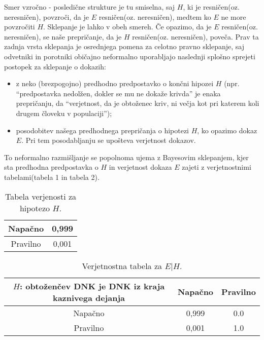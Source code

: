 \documentclass[a4paper,12pt]{article}
\begin{document}
Smer vzročno - posledične strukture je tu smiselna, saj $H$, ki je resničen(oz. neresničen), povzroči, da je $E$ resničen(oz. neresničen), 
medtem ko $E$ ne more povzročiti $H$. Sklepanje je lahko v obeh smereh. Če opazimo, da je $E$ resničen(oz. neresničen), se naše prepričanje, 
da je $H$ resničen(oz. neresničen), poveča. Prav ta zadnja vrsta sklepanja je osrednjega pomena za celotno pravno sklepanje, saj odvetniki in 
porotniki običajno neformalno uporabljajo naslednji splošno sprejeti postopek za sklepanje o dokazih:
\begin{itemize}
    \item z neko (brezpogojno) predhodno predpostavko o končni hipozei $H$ (npr. "`predpostavka nedolžen, dokler se mu ne dokaže krivda"' je enaka 
    prepričanju, da "`verjetnost, da je obtoženec kriv, ni večja kot pri katerem koli drugem človeku v populaciji"');
    \item posodobitev našega predhodnega prepričanja o hipotezi $H$, ko opazimo dokaz $E$. Pri tem posodabljanju se upošteva verjetnost dokazov.
\end{itemize}

To neformalno razmišljanje se popolnoma ujema z Bayesovim sklepanjem, kjer sta predhodna predpostavka o $H$ in verjetnost dokaza $E$ zajeti z 
verjetnostnimi tabelami(tabela 1 in tabela 2).

\begin{table}[h!]
\begin{center}
    \begin{tabular}{|c|c|} 
     \hline
     Napačno & 0,999 \\ \hline
     Pravilno & 0,001 \\ \hline
    \end{tabular}
    \caption{Tabela verjenosti za hipotezo $H$.}
    \label{table:stevila}
\end{center}
\end{table}

\begin{table}[h!]
\begin{center}
    \begin{tabular}{|c|c|c|} 
     \hline
     $H$: obtoženčev DNK je DNK iz kraja kaznivega dejanja & Napačno & Pravilno \\ \hline
     Napačno & 0,999 & 0.0 \\ \hline
     Pravilno & 0,001 & 1.0 \\ \hline
    \end{tabular}
    \caption{Verjetnostna tabela za $E \lvert H$.}
    \label{table:stevila}
\end{center}
\end{table}
\end{document}
